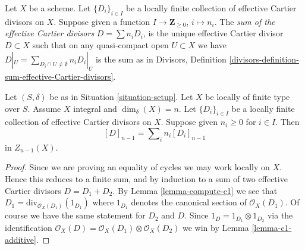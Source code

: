 \begin{definition}
\label{definition-locally-finite-sum-effective-Cartier-divisors}
Let $X$ be a scheme.
Let $\{D_i\}_{i \in I}$ be a locally finite collection
of effective Cartier divisors on $X$.
Suppose given a function
$I \to \mathbf{Z}_{\geq 0}$, $i \mapsto n_i$.
The {\it sum of the effective Cartier divisors}
$D = \sum n_i D_i$, is the unique effective Cartier divisor
$D \subset X$ such that on any quasi-compact open $U \subset X$
we have $D|_U = \sum_{D_i \cap U \not = \emptyset} n_iD_i|_U$
is the sum as in Divisors,
Definition \ref{divisors-definition-sum-effective-Cartier-divisors}.
\end{definition}

\begin{lemma}
\label{lemma-sum-divisors-associated-Weil}
Let $(S, \delta)$ be as in Situation \ref{situation-setup}.
Let $X$ be locally of finite type over $S$.
Assume $X$ integral and $\dim_\delta(X) = n$.
Let $\{D_i\}_{i \in I}$ be a locally finite collection
of effective Cartier divisors on $X$.
Suppose given $n_i \geq 0$ for $i \in I$.
Then
$$
[D]_{n - 1} = \sum\nolimits_i n_i[D_i]_{n - 1}
$$
in $Z_{n - 1}(X)$.
\end{lemma}

\begin{proof}
Since we are proving an equality of cycles we may work locally on $X$.
Hence this reduces to a finite sum, and by induction to a sum of
two effective Cartier divisors $D = D_1 + D_2$.
By Lemma \ref{lemma-compute-c1} we see that
$D_1 = \text{div}_{\mathcal{O}_X(D_1)}(1_{D_1})$ where
$1_{D_1}$ denotes the canonical section of $\mathcal{O}_X(D_1)$.
Of course we have the same statement for $D_2$ and $D$.
Since $1_D = 1_{D_1} \otimes 1_{D_2}$ via the identification
$\mathcal{O}_X(D) = \mathcal{O}_X(D_1) \otimes \mathcal{O}_X(D_2)$
we win by Lemma \ref{lemma-c1-additive}.
\end{proof}

